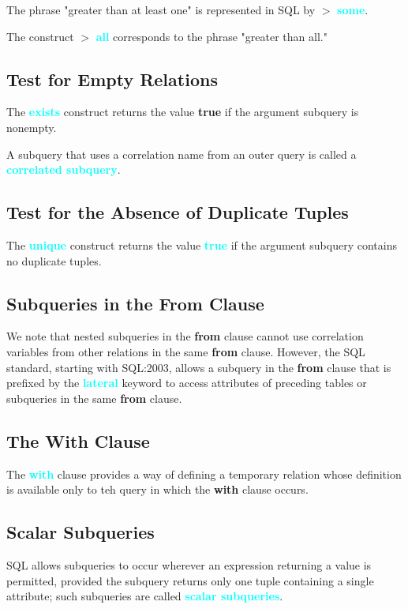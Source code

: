 \documentclass{Beautybook-EN}
\newcommand{\textcy}[1]{\textbf{\textcolor{cyan}{#1}}}
\begin{document}
The phrase "greater than at least one" is represented in SQL by $>$ \textcy{some}.

The construct $>$ \textcy{all} corresponds to the phrase "greater than all."

\subsection{Test for Empty Relations}

The \textcy{exists} construct returns the value \textbf{true} if the argument subquery is nonempty.

A subquery that uses a correlation name from an outer query is called a \textcy{correlated subquery}.

\subsection{Test for the Absence of Duplicate Tuples}

The \textcy{unique} construct returns the value \textcy{true} if the argument subquery contains no duplicate tuples.

\subsection{Subqueries in the From Clause}

We note that nested subqueries in the \textbf{from} clause cannot use correlation variables from other relations in the same \textbf{from} clause. However, the SQL standard, starting with SQL:2003, allows a subquery in the \textbf{from} clause that is prefixed by the \textcy{lateral} keyword to access attributes of preceding tables or subqueries in the same \textbf{from} clause.

\subsection{The With Clause}

The \textcy{with} clause provides a way of defining a temporary relation whose definition is available only to teh query in which the \textbf{with} clause occurs.

\subsection{Scalar Subqueries}

SQL allows subqueries to occur wherever an expression returning a value is permitted, provided the subquery returns only one tuple containing a single attribute; such subqueries are called \textcy{scalar subqueries}.
\end{document}
